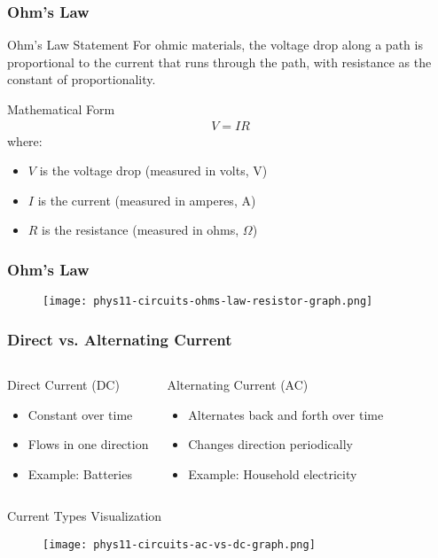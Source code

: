 \documentclass{beamer}
\begin{document}
\begin{frame}
\frametitle{Ohm's Law}
\begin{block}{Ohm's Law Statement}
For ohmic materials, the voltage drop along a path is proportional to the current that runs through the path, with resistance as the constant of proportionality.
\end{block}

\begin{block}{Mathematical Form}
\begin{align}
V = IR
\end{align}
where:
\begin{itemize}
\item $V$ is the voltage drop (measured in volts, V)
\item $I$ is the current (measured in amperes, A)
\item $R$ is the resistance (measured in ohms, $\Omega$)
\end{itemize}
\end{block}
\end{frame}

\begin{frame}
\frametitle{Ohm's Law}
\begin{alertblock}{}
\begin{figure}
    \centering
    \texttt{[image: phys11-circuits-ohms-law-resistor-graph.png]}
\end{figure}
\end{alertblock}
\end{frame}

\begin{frame}
\frametitle{Direct vs. Alternating Current}
\begin{columns}
\begin{block}{Direct Current (DC)}
\begin{itemize}
\item Constant over time
\item Flows in one direction
\item Example: Batteries
\end{itemize}
\end{block}

\begin{block}{Alternating Current (AC)}
\begin{itemize}
\item Alternates back and forth over time
\item Changes direction periodically
\item Example: Household electricity
\end{itemize}
\end{block}
\end{columns}

\begin{alertblock}{Current Types Visualization}
\begin{figure}
    \centering
    \texttt{[image: phys11-circuits-ac-vs-dc-graph.png]}
\end{figure}
\end{alertblock}
\end{frame}
\end{document}
